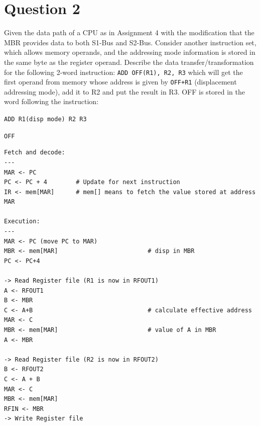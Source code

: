 \documentclass{article}
\begin{document}
\section*{Question 2}

Given the data path of a CPU as in Assignment 4 with the modification that the MBR provides data to both S1-Bus and S2-Bus. Consider another instruction set, which allows memory operands, and the addressing mode information is stored in the same byte as the register operand. Describe the data transfer/transformation for the following 2-word instruction: \texttt{ADD OFF(R1), R2, R3} which will get the first operand from memory whose address is given by \texttt{OFF+R1} (displacement addressing mode), add it to R2 and put the result in R3. OFF is stored in the word following the instruction:

\texttt{ADD R1(disp mode) R2 R3}

\texttt{OFF}

\begin{verbatim}
Fetch and decode:
---
MAR <- PC
PC <- PC + 4        # Update for next instruction
IR <- mem[MAR]      # mem[] means to fetch the value stored at address MAR

Execution:
---
MAR <- PC (move PC to MAR)
MBR <- mem[MAR]                         # disp in MBR
PC <- PC+4 

-> Read Register file (R1 is now in RFOUT1)
A <- RFOUT1 
B <- MBR 
C <- A+B                                # calculate effective address
MAR <- C 
MBR <- mem[MAR]                         # value of A in MBR
A <- MBR

-> Read Register file (R2 is now in RFOUT2)
B <- RFOUT2
C <- A + B
MAR <- C
MBR <- mem[MAR] 
RFIN <- MBR 
-> Write Register file
\end{verbatim}


\end{document}
